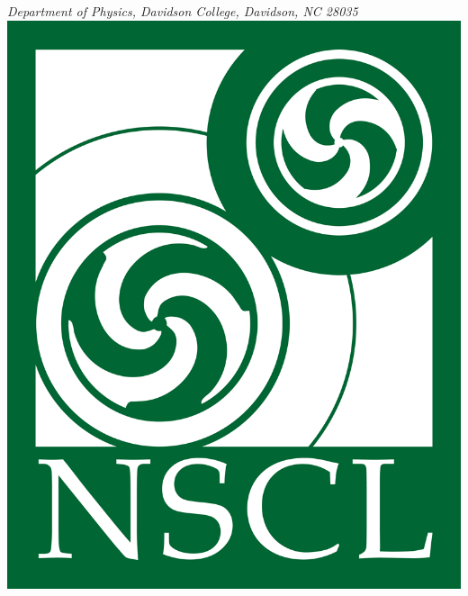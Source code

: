 \documentclass[a0paper,portrait]{baposter}
\begin{document}
\begin{poster}
{\smaller \it {Department of Physics, Davidson College, Davidson, NC 28035}} %
{\includegraphics[scale=0.3]{nscl_logo.png}} %


\end{poster}
\end{document}
